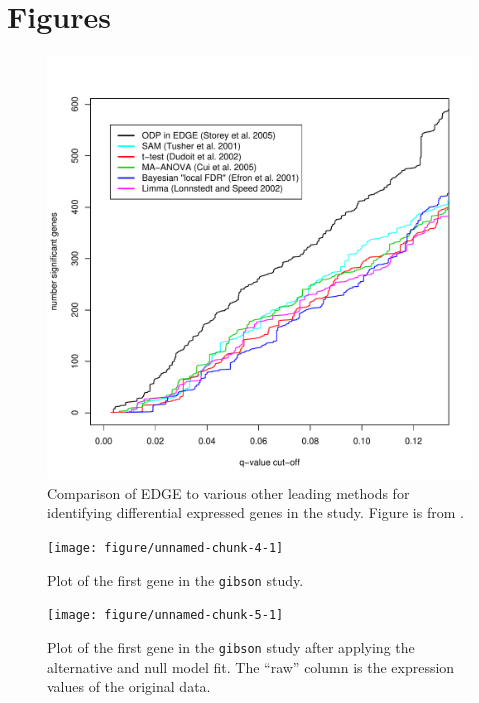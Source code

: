 \documentclass{article}\usepackage[]{graphicx}\usepackage[]{color}
\newenvironment{knitrout}{}{} %
\begin{document}
\section{Figures}
\begin{figure}[!htbp]
 \centering
\includegraphics[scale=.50]{edgecomp.pdf}
\caption{Comparison of EDGE to various other leading methods for identifying differential expressed genes in the \cite{hedenfalk:2001} study. Figure is from \cite{leek2005}.}
\label{fig:Comparison}
\end{figure}

\begin{figure}[!htbp]
 \centering
\begin{knitrout}
\color{fgcolor}

{\centering \texttt{[image: figure/unnamed-chunk-4-1]} 

}



\end{knitrout}
\caption{Plot of the first gene in the {\tt gibson} study.}
\label{fig:gplot}
\end{figure}

\begin{figure}[!htbp]
 \centering
\begin{knitrout}
\color{fgcolor}

{\centering \texttt{[image: figure/unnamed-chunk-5-1]} 

}



\end{knitrout}
\caption{Plot of the first gene in the {\tt gibson} study after applying the alternative and null model fit. The ``raw'' column is the expression values of the original data.}
\label{fig:gplotFit}
\end{figure}
\end{document}
